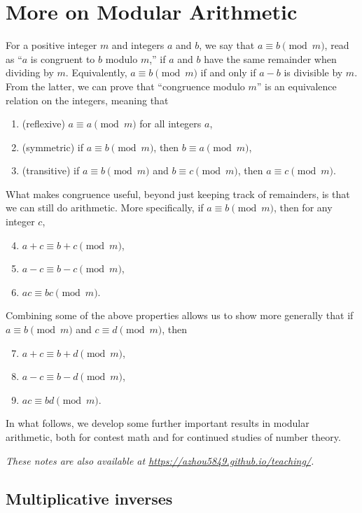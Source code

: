 \section{More on Modular Arithmetic}

For a positive integer $m$ and integers $a$ and $b$, we say that $a\equiv b\pmod{m}$, read as ``$a$ is congruent to $b$ modulo $m$,'' if $a$ and $b$ have the same remainder when dividing by $m$. Equivalently, $a\equiv b\pmod{m}$ if and only if $a - b$ is divisible by $m$. From the latter, we can prove that ``congruence modulo $m$'' is an equivalence relation on the integers, meaning that
\begin{enumerate}[label=(\alph*)]
\item (reflexive) $a\equiv a\pmod{m}$ for all integers $a$,
\item (symmetric) if $a\equiv b\pmod{m}$, then $b\equiv a\pmod{m}$,
\item (transitive) if $a\equiv b\pmod{m}$ and $b\equiv c\pmod{m}$, then $a\equiv c\pmod{m}$.
\end{enumerate}
What makes congruence useful, beyond just keeping track of remainders, is that we can still do arithmetic. More specifically, if $a\equiv b\pmod{m}$, then for any integer $c$,
\begin{enumerate}[label=(\alph*)]\setcounter{enumi}{3}
\item $a + c\equiv b + c\pmod{m}$,
\item $a - c\equiv b - c\pmod{m}$,
\item $ac\equiv bc\pmod{m}$.
\end{enumerate}
Combining some of the above properties allows us to show more generally that if $a\equiv b\pmod{m}$ and $c\equiv d\pmod{m}$, then
\begin{enumerate}[label=(\alph*)]\setcounter{enumi}{6}
\item $a + c\equiv b + d\pmod{m}$,
\item $a - c\equiv b - d\pmod{m}$,
\item $ac\equiv bd\pmod{m}$.
\end{enumerate}

In what follows, we develop some further important results in modular arithmetic, both for contest math and for continued studies of number theory.

\textit{These notes are also available at \url{https://azhou5849.github.io/teaching/}.}


\subsection{Multiplicative inverses}


